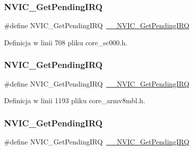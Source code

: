 \subsubsection{\texorpdfstring{N\+V\+I\+C\+\_\+\+Get\+Pending\+I\+RQ}{NVIC\_GetPendingIRQ}\hspace{0.1cm}{\footnotesize\ttfamily [4/12]}}
{\footnotesize\ttfamily \#define N\+V\+I\+C\+\_\+\+Get\+Pending\+I\+RQ~\hyperlink{group___c_m_s_i_s___core___n_v_i_c_functions_ga5a92ca5fa801ad7adb92be7257ab9694}{\+\_\+\+\_\+\+N\+V\+I\+C\+\_\+\+Get\+Pending\+I\+RQ}}



Definicja w linii 708 pliku core\+\_\+sc000.\+h.

\mbox{\label{group___c_m_s_i_s___core___n_v_i_c_functions_gac608957a239466e9e0cbc30aa64feb3b}} 
\subsubsection{\texorpdfstring{N\+V\+I\+C\+\_\+\+Get\+Pending\+I\+RQ}{NVIC\_GetPendingIRQ}\hspace{0.1cm}{\footnotesize\ttfamily [5/12]}}
{\footnotesize\ttfamily \#define N\+V\+I\+C\+\_\+\+Get\+Pending\+I\+RQ~\hyperlink{group___c_m_s_i_s___core___n_v_i_c_functions_ga5a92ca5fa801ad7adb92be7257ab9694}{\+\_\+\+\_\+\+N\+V\+I\+C\+\_\+\+Get\+Pending\+I\+RQ}}



Definicja w linii 1193 pliku core\+\_\+armv8mbl.\+h.

\mbox{\label{group___c_m_s_i_s___core___n_v_i_c_functions_gac608957a239466e9e0cbc30aa64feb3b}} 
\subsubsection{\texorpdfstring{N\+V\+I\+C\+\_\+\+Get\+Pending\+I\+RQ}{NVIC\_GetPendingIRQ}\hspace{0.1cm}{\footnotesize\ttfamily [6/12]}}
{\footnotesize\ttfamily \#define N\+V\+I\+C\+\_\+\+Get\+Pending\+I\+RQ~\hyperlink{group___c_m_s_i_s___core___n_v_i_c_functions_ga5a92ca5fa801ad7adb92be7257ab9694}{\+\_\+\+\_\+\+N\+V\+I\+C\+\_\+\+Get\+Pending\+I\+RQ}}



